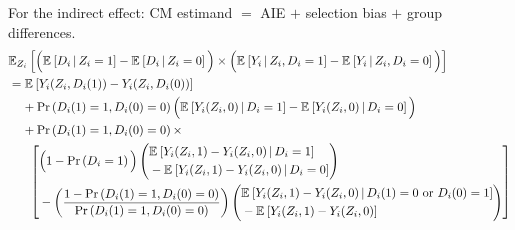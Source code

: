 \noindent
For the indirect effect: CM estimand $=$ AIE $+$ selection bias $+$ group differences.
\begin{align*}
    &\E[Z_i]{
        \Big( \Egiven{D_i}{Z_i = 1} - \Egiven{D_i}{Z_i = 0} \Big) \times
        \Big( \Egiven{Y_i}{Z_i, D_i = 1} - \Egiven{Y_i}{Z_i, D_i = 0} \Big) } \\
    & = \E{Y_i(Z_i, D_i(1)) - Y_i(Z_i, D_i(0))} \\
    & \;\;\;\; + \Prob{D_i(1) = 1, D_i(0) = 0} \Big(
        \Egiven{Y_i(Z_i, 0)}{D_i = 1} - \Egiven{Y_i(Z_i, 0)}{D_i = 0} \Big) \\
    & \;\;\;\; + \Prob{D_i(1) = 1, D_i(0) = 0} \times \\
    & \;\;\;\; \;\; \left[ \begin{aligned}
        &\Big( 1 - \Prob{D_i=1} \Big)
        \left( \begin{aligned}
            &\Egiven{Y_i(Z_i, 1) - Y_i(Z_i, 0)}{D_i = 1} \\ 
            &  - \Egiven{Y_i(Z_i, 1) - Y_i(Z_i, 0)}{D_i = 0}
        \end{aligned} \right) \\
        &- \left( \frac{1 - \Prob{D_i(1) = 1, D_i(0) = 0} }{
            \Prob{D_i(1) = 1, D_i(0) = 0}} \right)
        \left( \begin{aligned}
            &\Egiven{Y_i(Z_i, 1) - Y_i(Z_i, 0)}{D_i(1) = 0 \text{ or } D_i(0)=1} \\ 
            &  - \E{Y_i(Z_i, 1) - Y_i(Z_i, 0)}
        \end{aligned} \right)
    \end{aligned} \right]
\end{align*}

